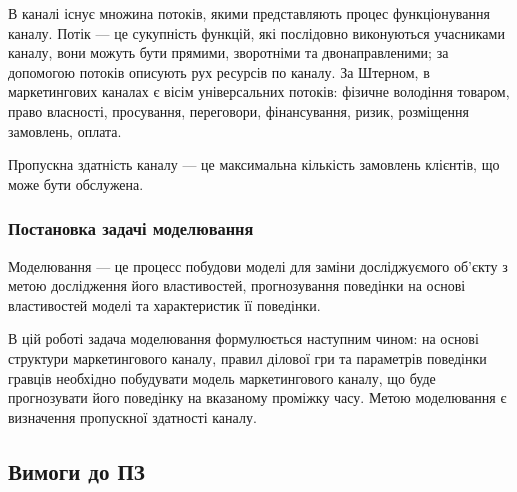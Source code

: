 В каналі існує множина потоків, якими представляють процес функціонування каналу. Потік --- це сукупність функцій, які послідовно виконуються учасниками каналу, вони можуть бути прямими, зворотніми та двонаправленими; за допомогою потоків описують рух ресурсів по каналу. За Штерном, в маркетингових каналах є вісім універсальних потоків\cite{stern}: фізичне володіння товаром, право власності, просування, переговори, фінансування, ризик, розміщення замовлень, оплата.

Пропускна здатність каналу --- це максимальна кількість замовлень клієнтів, що може бути обслужена.

    \subsubsection{Постановка задачі моделювання}

Моделювання --- це процесс побудови моделі для заміни досліджуємого об’єкту з метою дослідження його властивостей, прогнозування поведінки на основі властивостей моделі та характеристик її поведінки\cite{model}.
 
В цій роботі задача моделювання формулюється наступним чином: на основі структури маркетингового каналу, правил ділової гри та параметрів поведінки гравців необхідно побудувати модель маркетингового каналу, що буде прогнозувати його поведінку на вказаному проміжку часу. Метою моделювання є визначення пропускної здатності каналу.


    \subsection{Вимоги до ПЗ}
